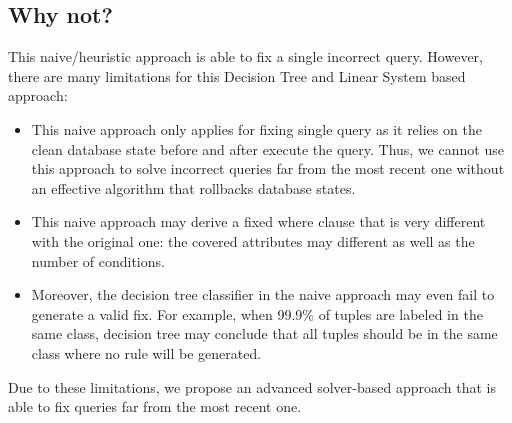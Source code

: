 \subsection{Why not?}
This naive/heuristic approach is able to fix a single incorrect query. However, 
there are many limitations for this Decision Tree and Linear System based approach:
\begin{itemize}
\item This naive approach only applies for fixing single query as it relies on the
clean database state before and after execute the query. Thus, we cannot use
this approach to solve incorrect queries far from the most recent one without 
an effective algorithm that rollbacks database states. 
\item This naive approach may derive a fixed where clause that is very different 
with the original one: the covered attributes may different as well as the number of 
conditions. 
\item Moreover, the decision tree classifier in the naive approach 
may even fail to generate a valid fix. For example, 
when 99.9\% of tuples are labeled
in the same class, decision tree may conclude that all tuples should be in the 
same class where no rule will be generated. 
\end{itemize}
Due to these limitations, we propose an advanced solver-based approach 
that is able to fix queries far from the most recent one. 


